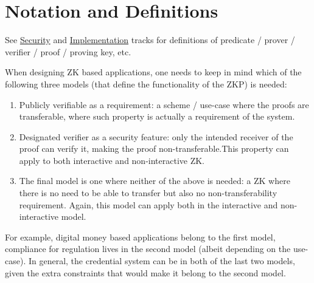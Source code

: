 \section{Notation and Definitions}
\label{apps:notation-defs}

See \hyperref[chap:security]{Security} and \hyperref[chap:implem]{Implementation} tracks for definitions of predicate / prover / verifier / proof / proving key, etc.

When designing ZK based applications, one needs to keep in mind which of the following three models (that define the functionality of the ZKP) is needed:
\begin{enumerate}
    \item Publicly verifiable as a requirement: a scheme / use-case where the proofs are transferable, where such property is actually a requirement of the system. 
    \item Designated verifier as a security feature: only the intended receiver of the proof can verify it, making the proof non-transferable.This property can apply to both interactive and non-interactive ZK.
    \item The final model is one where neither of the above is needed: a ZK where there is no need to be able to transfer but also no non-transferability requirement. Again, this model can apply both in the interactive and non-interactive model.
\end{enumerate}

For example, digital money based applications belong to the first model, compliance for regulation lives in the second model (albeit depending on the use-case). In general, the credential system can be in both of the last two models, given the extra constraints that would make it belong to the second model.

